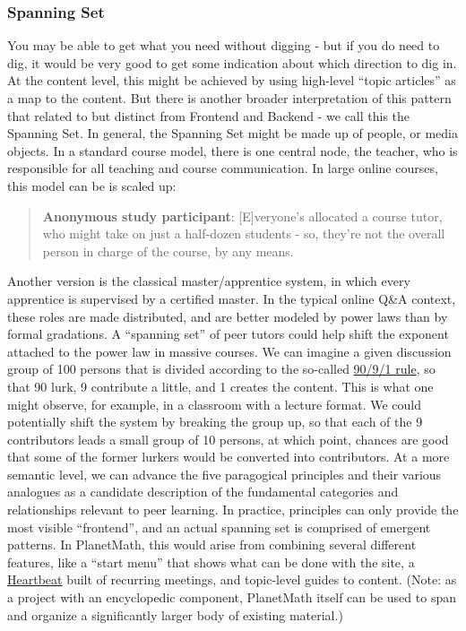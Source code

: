 \subsubsection{Spanning Set}

You may be able to get what you need without digging - but if you do
need to dig, it would be very good to get some indication about which
direction to dig in. At the content level, this might be achieved by
using high-level ``topic articles'' as a map to the content. But there
is another broader interpretation of this pattern that related to but
distinct from Frontend and Backend - we call this the Spanning Set. In
general, the Spanning Set might be made up of people, or media objects.
In a standard course model, there is one central node, the teacher, who
is responsible for all teaching and course communication. In large
online courses, this model can be is scaled up:

\begin{quote}
\textbf{Anonymous study participant}: {[}E{]}veryone's allocated a
course tutor, who might take on just a half-dozen students - so, they're
not the overall person in charge of the course, by any means.
\end{quote}
Another version is the classical master/apprentice system, in which
every apprentice is supervised by a certified master. In the typical
online Q\&A context, these roles are made distributed, and are better
modeled by power laws than by formal gradations. A ``spanning set'' of
peer tutors could help shift the exponent attached to the power law in
massive courses. We can imagine a given discussion group of 100 persons
that is divided according to the so-called
\href{http://www.wikipatterns.com/display/wikipatterns/90-9-1+Theory}{90/9/1
rule}, so that 90 lurk, 9 contribute a little, and 1 creates the
content. This is what one might observe, for example, in a classroom
with a lecture format. We could potentially shift the system by breaking
the group up, so that each of the 9 contributors leads a small group of
10 persons, at which point, chances are good that some of the former
lurkers would be converted into contributors. At a more semantic level,
we can advance the five paragogical principles and their various
analogues as a candidate description of the fundamental categories and
relationships relevant to peer learning. In practice, principles can
only provide the most visible ``frontend'', and an actual spanning set
is comprised of emergent patterns. In PlanetMath, this would arise from
combining several different features, like a ``start menu'' that shows
what can be done with the site, a
\href{http://peeragogy.org/practice/heartbeat/}{Heartbeat} built of
recurring meetings, and topic-level guides to content. (Note: as a
project with an encyclopedic component, PlanetMath itself can be used to
span and organize a significantly larger body of existing material.)

